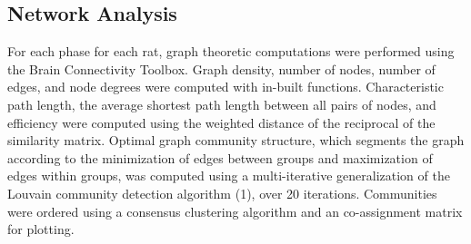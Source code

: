 \documentclass[9pt,twocolumn,twoside,lineno]{pnas-new}
\begin{document}
{\subsection*{Network Analysis}
For each phase for each rat, graph theoretic computations were performed using the Brain Connectivity Toolbox. Graph density, number of nodes, number of edges, and node degrees were computed with in-built functions. Characteristic path length, the average shortest path length between all pairs of nodes, and efficiency were computed using the weighted distance of the reciprocal of the similarity matrix. Optimal graph community structure, which segments the graph according to the minimization of edges between groups and maximization of edges within groups, was computed using a multi-iterative generalization of the Louvain community detection algorithm (1), over 20 iterations. Communities were ordered using a consensus clustering algorithm and an co-assignment matrix for plotting. 

}
\showmatmethods{} %


\showacknow{} %


\end{document}
